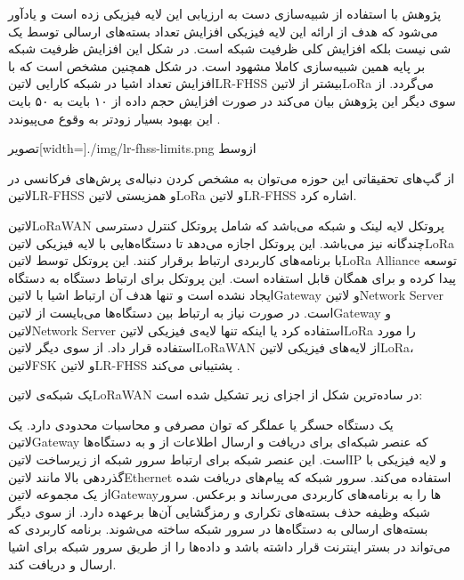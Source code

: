 پژوهش  با استفاده از شبیه‌سازی دست به ارزیابی این لایه فیزیکی زده است و یادآور می‌شود که هدف از ارائه این لایه فیزیکی
افزایش تعداد بسته‌های ارسالی توسط یک شی نیست بلکه افزایش کلی ظرفیت شبکه است. در شکل  این افزایش ظرفیت شبکه بر پایه همین
شبیه‌سازی کاملا مشهود است. در شکل  همچنین مشخص است که با افزایش تعداد اشیا در شبکه کارایی ‌لاتین{LR-FHSS} بیشتر از ‌لاتین{LoRa}
می‌گردد. از سوی دیگر این پژوهش بیان می‌کند در صورت افزایش حجم داده از ۱۰ بایت به ۵۰ بایت این بهبود بسیار زودتر به وقوع می‌پیوندد
.

‌تصویر[width=\textwidth]{./img/lr-fhss-limits.png}
‌ازوسط

از گپ‌های تحقیقاتی این حوزه می‌توان به مشخص کردن دنباله‌ی پرش‌های فرکانسی در ‌لاتین{LR-FHSS} و همزیستی ‌لاتین{LoRa} و ‌لاتین{LR-FHSS} اشاره کرد.


‌لاتین{LoRaWAN} پروتکل لایه لینک و شبکه می‌باشد که شامل پروتکل کنترل دسترسی چندگانه نیز می‌باشد.
این پروتکل اجازه می‌دهد تا دستگاه‌هایی با لایه فیزیکی ‌لاتین{LoRa} با برنامه‌های کاربردی ارتباط برقرار کنند.
این پروتکل توسط ‌لاتین{LoRa Alliance} توسعه پیدا کرده و برای همگان قابل استفاده است.
این پروتکل برای ارتباط دستگاه به دستگاه ایجاد نشده است و تنها هدف آن ارتباط اشیا با ‌لاتین{Gateway} و ‌لاتین{Network Server} است.
در صورت نیاز به ارتباط بین دستگاه‌ها می‌بایست از ‌لاتین{Gateway} و ‌لاتین{Network Server} استفاده کرد یا اینکه
تنها لایه‌ی فیزیکی ‌لاتین{LoRa} را مورد استفاده قرار داد.
از سوی دیگر ‌لاتین{LoRaWAN} از لایه‌های فیزیکی ‌لاتین{LoRa}، ‌لاتین{FSK} و ‌لاتین{LR-FHSS} پشتیبانی می‌کند
.

یک شبکه‌ی ‌لاتین{LoRaWAN} در ساده‌ترین شکل از اجزای زیر تشکیل شده است:

 یک دستگاه حسگر یا عملگر که توان مصرفی و محاسبات محدودی دارد.
 یک ‌لاتین{Gateway} که عنصر شبکه‌ای برای دریافت و ارسال اطلاعات از و به دستگاه‌ها است. این عنصر شبکه برای ارتباط سرور شبکه
از زیرساخت ‌لاتین{IP} و لایه فیزیکی با گذردهی بالا مانند ‌لاتین{Ethernet} استفاده می‌کند.
 سرور شبکه که پیام‌های دریافت شده از یک مجموعه ‌لاتین{Gateway}ها را به برنامه‌های کاربردی می‌رساند و برعکس.
سرور شبکه وظیفه حذف بسته‌های تکراری
و رمزگشایی آن‌ها برعهده دارد. از سوی دیگر بسته‌های ارسالی به دستگاه‌ها در سرور شبکه ساخته می‌شوند.
 برنامه کاربردی که می‌تواند در بستر اینترنت قرار داشته باشد و داده‌ها را از طریق سرور شبکه برای اشیا ارسال و دریافت کند.

